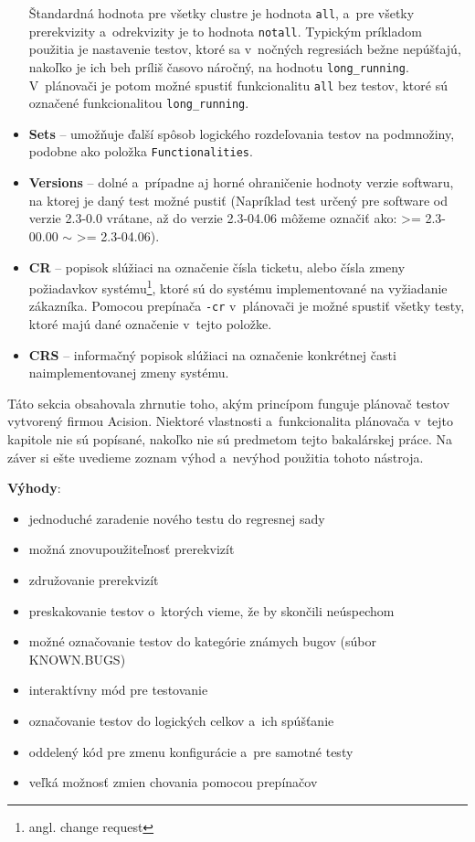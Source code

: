 \begin{itemize}
Štandardná hodnota pre všetky clustre je hodnota \texttt{all}, a~pre všetky prerekvizity a~odrekvizity je to hodnota \texttt{notall}.
Typickým príkladom použitia je nastavenie testov, ktoré sa v~nočných regresiách bežne nepúšťajú, 
nakoľko je ich beh príliš časovo náročný, na hodnotu \texttt{long\_running}.
V~plánovači je potom možné spustiť funkcionalitu \texttt{all} bez testov, ktoré sú označené funkcionalitou \texttt{long\_running}.
\item \textbf{Sets} -- umožňuje ďalší spôsob logického rozdeľovania testov na podmnožiny, podobne ako položka \texttt{Functionalities}.
\item \textbf{Versions} -- dolné a~prípadne aj horné ohraničenie hodnoty verzie softwaru, na ktorej je daný test možné pustiť
(Napríklad test určený pre software od verzie 2.3-0.0 vrátane, až do verzie 2.3-04.06 môžeme označiť ako: \textgreater= 2.3-00.00 $\sim$ \textgreater= 2.3-04.06).
\item \textbf{CR} -- popisok slúžiaci na označenie čísla ticketu, alebo čísla zmeny požiadavkov systému\footnote{angl. change request}, ktoré sú do systému implementované
na vyžiadanie zákazníka. 
Pomocou prepínača \texttt{-cr} v~plánovači je možné spustiť všetky testy, ktoré majú dané označenie v~tejto položke.
\item \textbf{CRS} -- informačný popisok slúžiaci na označenie konkrétnej časti naimplementovanej zmeny systému. 
\end{itemize}


Táto sekcia obsahovala zhrnutie toho, akým princípom funguje plánovač testov vytvorený firmou Acision.
Niektoré vlastnosti a~funkcionalita plánovača v~tejto kapitole nie sú popísané, nakoľko nie sú predmetom tejto bakalárskej práce. 
Na záver si ešte uvedieme zoznam výhod a~nevýhod použitia tohoto nástroja.

\noindent \textbf{Výhody}:
\begin{itemize}
\item jednoduché zaradenie nového testu do regresnej sady
\item možná znovupoužiteľnosť prerekvizít
\item združovanie prerekvizít
\item preskakovanie testov o~ktorých vieme, že by skončili neúspechom
\item možné označovanie testov do kategórie známych bugov (súbor KNOWN.BUGS)
\item interaktívny mód pre testovanie
\item označovanie testov do logických celkov a~ich spúšťanie
\item oddelený kód pre zmenu konfigurácie a~pre samotné testy
\item veľká možnosť zmien chovania pomocou prepínačov
\end{itemize} 

